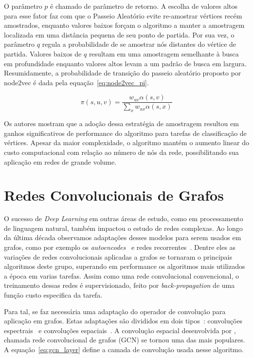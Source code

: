 O parâmetro $p$ é chamado de parâmetro de retorno.
A escolha de valores altos para esse fator faz com que o Passeio Aleatório evite
re-amostrar vértices recém amostrados, enquanto valores baixos forçam o
algoritmo a manter a amostragem localizada em uma distância pequena de seu ponto
de partida.
Por sua vez, o parâmetro $q$ regula a probabilidade de se amostrar nós distantes
do vértice de partida.
Valores baixos de $q$ resultam em uma amostragem semelhante à busca em
profundidade enquanto valores altos levam a um padrão de busca em largura.
Resumidamente, a probabilidade de transição do passeio aleatório proposto por
node2vec é dada pela equação~\ref{eq:node2vec_pi}.

\begin{equation} \label{eq:node2vec_pi}
    \pi(s, u, v) = \frac{w_{uv} \alpha(s,v)}{\sum_{x} w_{ux} \alpha(s,x)}
\end{equation}

Os autores mostram que a adoção dessa estratégia de amostragem resultou em
ganhos significativos de performance do algoritmo para tarefas de classificação
de vértices.
Apesar da maior complexidade, o algoritmo mantém o aumento linear do custo
computacional com relação ao número de nós da rede, possibilitando sua aplicação
em redes de grande volume.

\section{Redes Convolucionais de Grafos}

O sucesso de \textit{Deep Learning} em outras áreas de estudo, como em
processamento de linguagem natural, também impactou o estudo de redes complexas.
Ao longo da última década observamos adaptações desses modelos para serem usados
em grafos, como por exemplo os \textit{autoencodes}~\cite{wang16}\cite{cao16}
e redes recorrentes~\cite{scarselli08}\cite{you18}.
Dentre eles as variações de redes convolucionais aplicadas a grafos se tornaram
o principais algoritmos deste grupo, superando em performance os algoritmos mais
utilizados a época em varias tarefas.
Assim como uma rede convolucional convencional, o treinamento dessas redes é
supervisionado, feito por \textit{back-propagation} de uma função custo especifica
da tarefa.

Para tal, se faz necessária uma adaptação do operador de convolução para aplicação
em grafos. Estas adaptações são divididos em dois tipos~\cite{zhang20}: convoluções
espectrais~\cite{bruna13}\cite{defferrard16} e convoluções espaciais~\cite{kipf16}.
A convolução espacial desenvolvida por \citet{kipf16}, chamada rede
convolucional de grafos (GCN) se tornou uma das mais populares.
A equação~\ref{eq:gcn_layer} define a camada de convolução usada nesse
algoritmo.

